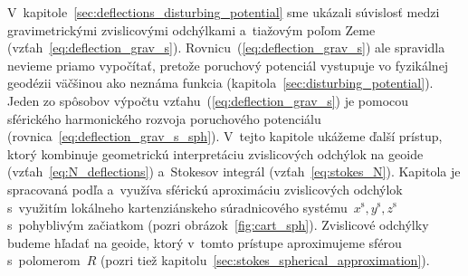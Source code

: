 \documentclass[a4paper, 12pt]{book}
\begin{document}
V~kapitole~\ref{sec:deflections_disturbing_potential} sme ukázali súvislosť 
medzi gravimetrickými zvislicovými odchýlkami a~tiažovým poľom Zeme 
(vzťah~\ref{eq:deflection_grav_s}).  Rovnicu~(\ref{eq:deflection_grav_s}) ale 
spravidla nevieme priamo vypočítať, pretože poruchový potenciál vystupuje vo 
fyzikálnej geodézii väčšinou ako neznáma funkcia 
(kapitola~\ref{sec:disturbing_potential}).  Jeden zo spôsobov výpočtu 
vzťahu~(\ref{eq:deflection_grav_s}) je pomocou sférického harmonického rozvoja 
poruchového potenciálu (rovnica~\ref{eq:deflection_grav_s_sph}).  V~tejto 
kapitole ukážeme ďalší prístup, ktorý kombinuje geometrickú interpretáciu 
zvislicových odchýlok na geoide (vzťah~\ref{eq:N_deflections}) a~Stokesov 
integrál (vzťah~\ref{eq:stokes_N}).  Kapitola je spracovaná podľa 
\textcite{MoritzPhysicalGeodesy} a~využíva sférickú aproximáciu zvislicových 
odchýlok s~využitím lokálneho kartenziánskeho súradnicového 
systému~$x^\mathrm{s}, y^\mathrm{s}, z^\mathrm{s}$ s~pohyblivým začiatkom 
(pozri obrázok~\ref{fig:cart_sph}).  Zvislicové odchýlky budeme hľadať na 
geoide, ktorý v~tomto prístupe aproximujeme sférou s~polomerom~$R$ (pozri tiež 
kapitolu~\ref{sec:stokes_spherical_approximation}).
\end{document}
